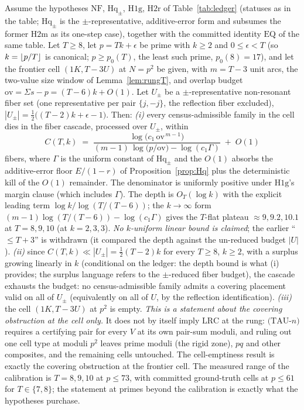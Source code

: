 \begin{theorem}\label{thm:SC}
Assume the hypotheses $\mathrm{NF}$, $\mathrm{Hq}_\pm$, $\mathrm{H1g}$,
$\mathrm{H2r}$ of Table~\ref{tab:ledger} (statuses as in the table;
$\mathrm{Hq}_\pm$ is the $\pm$-representative, additive-error form and
subsumes the former $\mathrm{H2m}$ as its one-step case), together with the
committed identity $\mathrm{EQ}$ of the same table. Let $T\ge 8$, let
$p=Tk+\epsilon$ be prime with $k\ge 2$ and $0\le\epsilon<T$ (so $k=\left\lfloor p/T \right\rfloor$
is canonical; $p\ge p_0(T)$, the least such prime, $p_0(8)=17$), and let the
frontier cell $(1K,T{-}3U)$ at $N=p^2$ be given, with $m=T-3$ unit arcs, the
two-value size window of Lemma~\ref{lem:rungT}, and overlap budget
$\mathrm{ov}=\Sigma s-p=(T-6)k+O(1)$. Let $U_\pm$ be a $\pm$-representative
non-resonant fiber set (one representative per pair $\{j,-j\}$, the
reflection fiber excluded), $|U_\pm|=\tfrac12\bigl((T-2)k+\epsilon-1\bigr)$.
Then:
\smallskip
\emph{(i)} every census-admissible family in the cell dies in the fiber
cascade, processed over $U_\pm$, within
\[
C(T,k)\;=\;
\frac{\log\!\bigl(c_1\,\mathrm{ov}^{\,m-1}\bigr)}
     {(m-1)\,\log\!\bigl(p/\mathrm{ov}\bigr)-\log(c_1\Gamma)}
\;+\;O(1)
\]
fibers, where $\Gamma$ is the uniform constant of $\mathrm{Hq}_\pm$ and the
$O(1)$ absorbs the additive-error floor $E/(1-r)$ of
Proposition~\ref{prop:Hq} plus the deterministic kill of the $O(1)$
remainder. The denominator is uniformly positive under $\mathrm{H1g}$'s
margin clause (which includes $\Gamma$). The depth is $O_T(\log k)$ with the
explicit leading term $\log k/\log(T/(T-6))$; the $k\to\infty$ form
$(m-1)\log(T/(T-6))-\log(c_1\Gamma)$ gives the $T$-flat plateau
$\approx 9,9.2,10.1$ at $T=8,9,10$ (at $k=2,3,3$). \emph{No $k$-uniform
linear bound is claimed}; the earlier ``$\le T+3$'' is withdrawn (it compared
the depth against the un-reduced budget $|U|$).
\smallskip
\emph{(ii)} since $C(T,k)\ll|U_\pm|=\tfrac12(T-2)k$ for every $T\ge8$,
$k\ge2$, with a surplus growing linearly in $k$ (conditional on the ledger:
the depth bound is what (i) provides; the surplus language refers to the
$\pm$-reduced fiber budget), the cascade exhausts the budget: no
census-admissible family admits a covering placement valid on all of
$U_\pm$ (equivalently on all of $U$, by the reflection identification).
\smallskip
\emph{(iii)} the cell $(1K,T{-}3U)$ at $p^2$ is empty. \emph{This is a
statement about the covering obstruction at the cell only.} It does not by
itself imply $\mathrm{LRC}$ at the rung: $(\mathrm{TAU}$-$n)$ requires a
certifying pair for every $V$ at its own pair-sum moduli, and ruling out one
cell type at moduli $p^2$ leaves prime moduli (the rigid zone), $pq$ and
other composites, and the remaining cells untouched. The cell-emptiness
result is exactly the covering obstruction at the frontier cell.
The measured range of the calibration is $T=8,9,10$ at $p\le 73$, with
committed ground-truth cells at $p\le 61$ for $T\in\{7,8\}$; the statement
at primes beyond the calibration is exactly what the hypotheses purchase.
\end{theorem}

